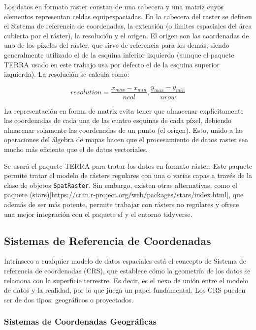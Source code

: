 \documentclass[12pt,a4paper,]{book}
\numberwithin{dummy}{section}
\theoremstyle{ocrenumbox}
\theoremstyle{blacknumex}
\theoremstyle{blacknumbox}
\theoremstyle{ocrenum}
\theoremstyle{ocrenum}
\begin{document}
Los datos en formato raster constan de una cabecera y una matriz cuyos
elementos representan celdas equipespaciadas. En la cabecera del raster
se definen el Sistema de referencia de coordenadas, la extensión (o
límites espaciales del área cubierta por el ráster), la resolución y el
origen. El origen son las coordenadas de uno de los píxeles del ráster,
que sirve de referencia para los demás, siendo generalmente utilizado el
de la esquina inferior izquierda (aunque el paquete TERRA usado en este
trabajo usa por defecto el de la esquina superior izquierda). La
resolución se calcula como:

\[ resolution = \frac{x_{max}-x_{min}}{ncol},\frac{y_{max}-y_{min}}{nrow} \]

La representación en forma de matriz evita tener que almacenar
explícitamente las coordenadas de cada una de las cuatro esquinas de
cada píxel, debiendo almacenar solamente las coordenadas de un punto (el
origen). Esto, unido a las operaciones del álgebra de mapas hacen que el
procesamiento de datos raster sea mucho más eficiente que el de datos
vectoriales.

Se usará el paquete TERRA para tratar los datos en formato ráster. Este
paquete permite tratar el modelo de rásters regulares con una o varias
capas a través de la clase de objetos \texttt{SpatRaster}. Sin embargo,
existen otras alternativas, como el paquete
(stars){[}\url{https://cran.r-project.org/web/packages/stars/index.html}{]},
que además de ser más potente, permite trabajar con rásters no regulares
y ofrece una mejor integración con el paquete sf y el entorno tidyverse.

\hypertarget{sistemas-de-referencia-de-coordenadas}{%
\subsection{Sistemas de Referencia de
Coordenadas}\label{sistemas-de-referencia-de-coordenadas}}

Intrínseco a cualquier modelo de datos espaciales está el concepto de
Sistema de referencia de coordenadas (CRS), que establece cómo la
geometría de los datos se relaciona con la superficie terrestre. Es
decir, es el nexo de unión entre el modelo de datos y la realidad, por
lo que juega un papel fundamental. Los CRS pueden ser de dos tipos:
geográficos o proyectados.

\hypertarget{sistemas-de-coordenadas-geogruxe1ficas}{%
\subsubsection{Sistemas de Coordenadas
Geográficas}\label{sistemas-de-coordenadas-geogruxe1ficas}}
\end{document}
